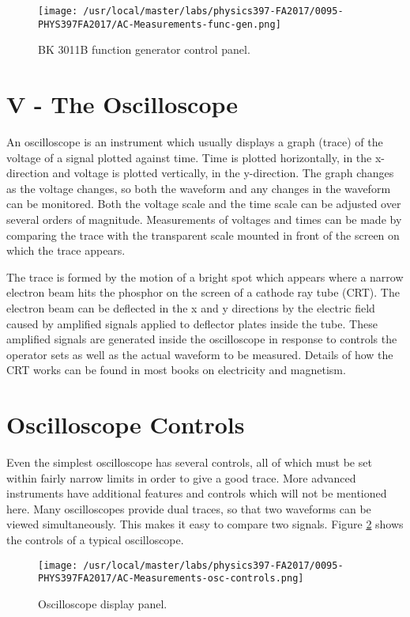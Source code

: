 \begin{figure}
\texttt{[image: /usr/local/master/labs/physics397-FA2017/0095-PHYS397FA2017/AC-Measurements-func-gen.png]}
\caption{BK 3011B function generator control panel.}
\label{fig:acFG}
\end{figure}

\section{{\bf V - The Oscilloscope}}

An oscilloscope is an instrument which usually displays a graph (trace) of the voltage of a signal plotted against time. Time is plotted horizontally, in the x-direction and voltage is plotted vertically, in the y-direction. The graph changes as the voltage changes, so both the waveform and any changes in the waveform can be monitored. Both the voltage scale and the time scale can be adjusted over several orders of magnitude. Measurements of voltages and times can be made by comparing the trace with the transparent scale mounted in front of the screen on which the trace appears. 

The trace is formed by the motion of a bright spot which appears where a narrow electron beam hits the phosphor on the screen of a cathode ray tube (CRT). The electron beam can be deflected in the x and y directions by the electric field caused by amplified signals applied to deflector plates inside the tube. These amplified signals are generated inside the oscilloscope in response to controls the operator sets as well as the actual waveform to be measured. Details of how the CRT works can be found in most books on electricity and magnetism.

\section{{\bf Oscilloscope Controls}}

Even the simplest oscilloscope has several controls, all of which must be set within fairly narrow limits in order to give a good trace. More advanced instruments have additional features and controls which will not be mentioned here. Many oscilloscopes provide dual traces, so that two waveforms can be viewed simultaneously. This makes it easy to compare two signals. Figure \ref{fig:acOscilloscope} shows the controls of a typical oscilloscope.

\begin{figure}
\texttt{[image: /usr/local/master/labs/physics397-FA2017/0095-PHYS397FA2017/AC-Measurements-osc-controls.png]}
\caption{Oscilloscope display panel.}
\label{fig:acOscilloscope}
\end{figure}

